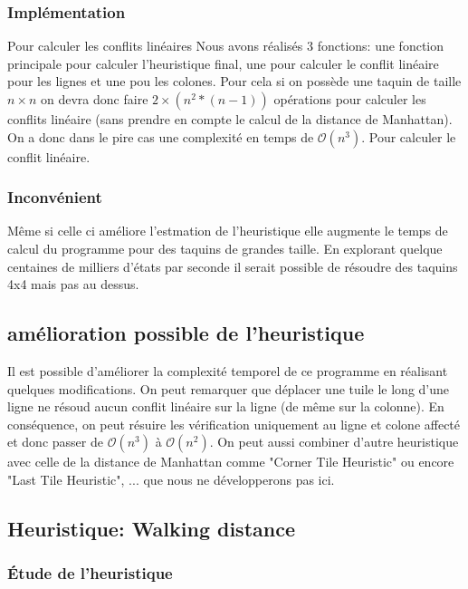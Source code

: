 \documentclass[a4paper, 12pt]{article}
\begin{document}
\subsubsection{Implémentation}

Pour calculer les conflits linéaires Nous avons réalisés 3 fonctions: une fonction principale pour calculer l'heuristique final, une pour calculer le conflit linéaire pour les lignes et une pou les colones. Pour cela si on possède une taquin de taille $n \times n$ on devra donc faire $2 \times (n^2*(n-1))$ opérations pour calculer les conflits linéaire (sans prendre en compte le calcul de la distance de Manhattan).
On a donc dans le pire cas une complexité en temps de $ \mathcal{O}(n^3)$. Pour calculer le conflit linéaire.

\subsubsection{Inconvénient}

Même si celle ci améliore l'estmation de l'heuristique elle augmente le temps de calcul du programme pour des taquins de grandes taille. En explorant quelque centaines de milliers d'états par seconde il serait possible de résoudre des taquins 4x4 mais pas au dessus.

\subsection{amélioration possible de l'heuristique}
Il est possible d'améliorer la complexité temporel de ce programme en réalisant quelques modifications. On peut remarquer que déplacer une tuile le long d'une ligne ne résoud aucun conflit linéaire sur la ligne (de même sur la colonne). En conséquence, on peut résuire les vérification uniquement au ligne et colone affecté et donc passer de $\mathcal{O}(n^{3})$ à $\mathcal{O}(n^{2})$.
On peut aussi combiner d'autre heuristique avec celle de la distance de Manhattan comme "Corner Tile Heuristic" ou encore "Last Tile Heuristic", ... que nous ne développerons pas ici.
\subsection{Heuristique: Walking distance}

\subsubsection{Étude de l'heuristique}
\end{document}
